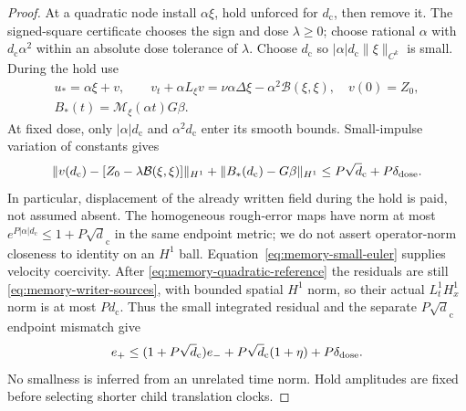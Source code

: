 \documentclass[11pt,a4paper]{amsart}
\theoremstyle{definition}
\theoremstyle{remark}
\numberwithin{equation}{section}
\newcommand{\Bcal}{\mathcal B}
\newcommand{\Mcal}{\mathcal M}
\newcommand{\norm}[1]{\lVert #1\rVert}
\begin{document}
\begin{proof}
At a quadratic node install $\alpha\xi$, hold unforced for $d_{\mathrm c}$, then
remove it.  The signed-square certificate chooses the sign and dose
$\lambda\ge0$; choose rational $\alpha$ with $d_{\mathrm c}\alpha^2$ within an
absolute dose tolerance of $\lambda$.  Choose $d_{\mathrm c}$ so
$|\alpha|d_{\mathrm c}\norm\xi_{C^k}$ is small.  During the hold use
\begin{equation}\label{eq:memory-quadratic-reference}
 \begin{gathered}
 u_*=\alpha\xi+v,\qquad
 v_t+\alpha L_\xi v=\nu\alpha\Delta\xi-\alpha^2\Bcal(\xi,\xi),
 \quad v(0)=Z_0,\\
 B_*(t)=\Mcal_\xi(\alpha t)G\beta.
 \end{gathered}
\end{equation}
At fixed dose, only $|\alpha|d_{\mathrm c}$ and $\alpha^2d_{\mathrm c}$ enter its smooth bounds.
Small-impulse variation of constants gives
\begin{equation}\label{eq:memory-quadratic-mismatch}
 \norm{v(d_{\mathrm c})-[Z_0-\lambda\Bcal(\xi,\xi)]}_{H^1}
       +\norm{B_*(d_{\mathrm c})-G\beta}_{H^1}
       \le P\sqrt d_{\mathrm c}+P\delta_{\rm dose}.
\end{equation}
In particular, displacement of the already written field during the hold
is paid, not assumed absent.  The homogeneous rough-error maps have
norm at most $e^{P|\alpha|d_{\mathrm c}}\le1+P\sqrt d_{\mathrm c}$ in the same endpoint metric;
we do not assert operator-norm closeness to identity on an $H^1$ ball.
Equation~\eqref{eq:memory-small-euler} supplies velocity coercivity.
After \eqref{eq:memory-quadratic-reference} the residuals are still
\eqref{eq:memory-writer-sources}, with bounded spatial $H^1$ norm,
so their actual $L^1_tH^1_x$ norm is at most $Pd_{\mathrm c}$.  Thus the small
integrated residual and the separate $P\sqrt d_{\mathrm c}$ endpoint mismatch give
\begin{equation}\label{eq:memory-quadratic-bound}
 e_+\le(1+P\sqrt d_{\mathrm c})e_-+P\sqrt d_{\mathrm c}(1+\eta)+P\delta_{\rm dose}.
\end{equation}
No smallness is inferred from an unrelated time norm.  Hold amplitudes
are fixed before selecting shorter child translation clocks.


\end{proof}
\end{document}
